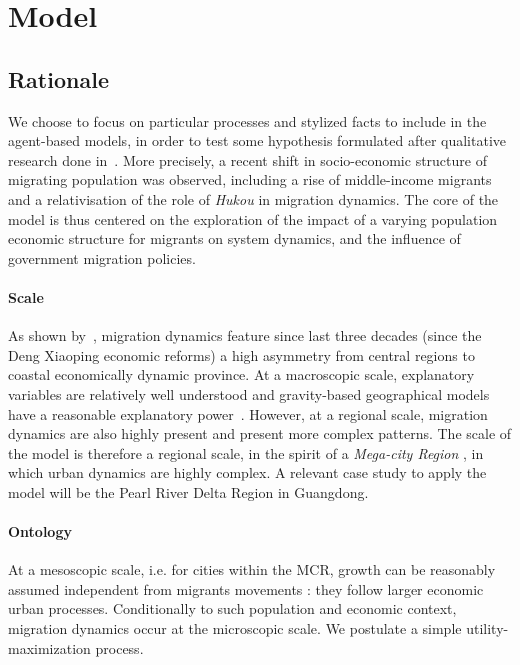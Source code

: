 \section{Model}

\subsection{Rationale}

We choose to focus on particular processes and stylized facts to include in the agent-based models, in order to test some hypothesis formulated after qualitative research done in~\cite{losavio2016analyser}. More precisely, a recent shift in socio-economic structure of migrating population was observed, including a rise of middle-income migrants and a relativisation of the role of \emph{Hukou} in migration dynamics. The core of the model is thus centered on the exploration of the impact of a varying population economic structure for migrants on system dynamics, and the influence of government migration policies.

\paragraph{Scale} As shown by~\cite{chan2012migration}, migration dynamics feature since last three decades (since the Deng Xiaoping economic reforms) a high asymmetry from central regions to coastal economically dynamic province. At a macroscopic scale, explanatory variables are relatively well understood and gravity-based geographical models have a reasonable explanatory power~\cite{fan2005modeling}. However, at a regional scale, migration dynamics are also highly present and present more complex patterns. The scale of the model is therefore a regional scale, in the spirit of a \emph{Mega-city Region} \cite{hall2006polycentric}, in which urban dynamics are highly complex. A relevant case study to apply the model will be the Pearl River Delta Region in Guangdong.

\paragraph{Ontology} At a mesoscopic scale, i.e. for cities within the MCR, growth can be reasonably assumed independent from migrants movements : they follow larger economic urban processes. Conditionally to such population and economic context, migration dynamics occur at the microscopic scale. We postulate a simple utility-maximization process.


